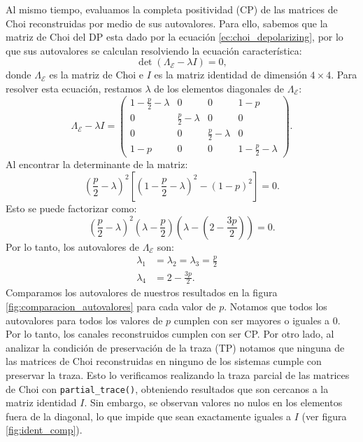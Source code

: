 \documentclass[letterpaper,12pt]{thesisECFM}
\theoremstyle{plain}
\theoremstyle{definition}
\theoremstyle{definition}
\theoremstyle{remark}
\newcommand{\1}{\mathbb{1}}
\begin{document}
Al mismo tiempo, evaluamos la completa positividad (CP) de las matrices de Choi reconstruidas por medio de sus autovalores. Para ello, sabemos que la matriz de Choi del DP esta dado por la ecuación \ref{ec:choi_depolarizing}, por lo que sus autovalores se calculan resolviendo la ecuación característica:
\begin{equation}
\det(\Lambda_\mathcal{E} - \lambda I) = 0,
\end{equation}
donde $\Lambda_\mathcal{E}$ es la matriz de Choi e $I$ es la matriz identidad
de dimensión $4 \times 4$. Para resolver esta ecuación, restamos $\lambda$ de
los elementos diagonales de $\Lambda_\mathcal{E}$:
\begin{equation}
\Lambda_\mathcal{E} - \lambda I = \begin{pmatrix}
1 - \frac{p}{2} - \lambda & 0 & 0 & 1 - p \\
0 & \frac{p}{2} - \lambda & 0 & 0 \\
0 & 0 & \frac{p}{2} - \lambda & 0 \\
1 - p & 0 & 0 & 1 - \frac{p}{2} - \lambda
\end{pmatrix}.
\end{equation}
Al encontrar la determinante de la matriz:
\begin{equation}
\left( \frac{p}{2} - \lambda \right)^2  \left[ \left( 1 - \frac{p}{2} - \lambda \right)^2 - (1 - p)^2 \right] = 0.
\end{equation}
Esto se puede factorizar como:
\begin{equation}
\left( \frac{p}{2} - \lambda \right)^2 \left( \lambda - \frac{p}{2} \right) \left( \lambda - \left( 2 - \frac{3p}{2} \right) \right) = 0.
\end{equation}
Por lo tanto, los autovalores de $\Lambda_{\mathcal{E}}$ son:
\begin{align}
\lambda_1 &=\lambda_2=\lambda_3 = \frac{p}{2} \quad \\
\lambda_4 &= 2 - \frac{3p}{2} .
\end{align}
Comparamos los autovalores de nuestros resultados en la figura
\ref{fig:comparacion_autovalores} para cada valor de $p$. Notamos que todos los
autovalores para todos los valores de $p$ cumplen con ser mayores o iguales a
0. Por lo tanto, los canales reconstruidos cumplen con ser CP.  Por otro
lado, al analizar la condición de preservación de la traza (TP) notamos que
ninguna de las matrices de Choi reconstruidas en ninguno de los sistemas cumple
con preservar la traza. Esto lo verificamos realizando la traza parcial de las matrices de Choi con \texttt{partial\_trace()}, obteniendo resultados que son cercanos a la matriz identidad $I$. Sin embargo, se observan valores no nulos en los elementos fuera de la diagonal, lo que impide que sean exactamente iguales a $I$ (ver figura \ref{fig:ident_comp}).
\end{document}
